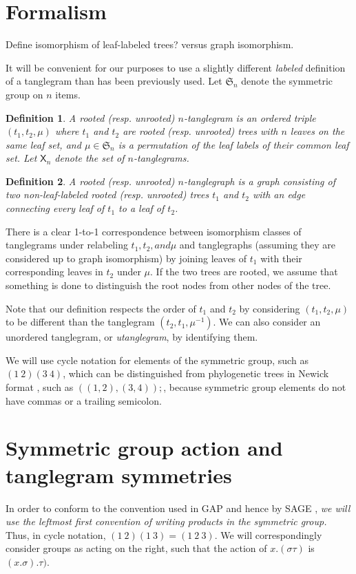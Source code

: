 \documentclass{amsart}
\newtheorem{definition}{Definition}
\newcommand{\fS}{\mathfrak S}
\newcommand{\pairing}{\mu}
\newcommand{\tangle}{\mathsf{X}}
\begin{document}
\section{Formalism}
Define isomorphism of leaf-labeled trees?
versus graph isomorphism.

It will be convenient for our purposes to use a slightly different \emph{labeled} definition of a tanglegram than has been previously used.
Let $\fS_n$ denote the symmetric group on $n$ items.
\begin{definition}
\label{def:tanglegram}
A rooted (resp. unrooted) $n$-\emph{tanglegram} is an ordered triple $(t_1, t_2, \pairing)$ where $t_1$ and $t_2$ are rooted (resp. unrooted) trees with $n$ leaves on the same leaf set, and $\pairing \in \fS_n$ is a permutation of the leaf labels of their common leaf set.
Let $\tangle_n$ denote the set of $n$-tanglegrams.
\end{definition}
\begin{definition}
\label{def:tanglegraph}
A rooted (resp. unrooted) $n$-\emph{tanglegraph} is a graph consisting of two non-leaf-labeled rooted (resp. unrooted) trees $t_1$ and $t_2$ with an edge connecting every leaf of $t_1$ to a leaf of $t_2$.
\end{definition}
There is a clear 1-to-1 correspondence between isomorphism classes of tanglegrams under relabeling $t_1, t_2, and \pairing$ and tanglegraphs (assuming they are considered up to graph isomorphism) by joining leaves of $t_1$ with their corresponding leaves in $t_2$ under $\pairing$.
If the two trees are rooted, we assume that something is done to distinguish the root nodes from other nodes of the tree.

Note that our definition respects the order of $t_1$ and $t_2$ by considering $(t_1, t_2, \pairing)$ to be different than the tanglegram $(t_2, t_1, \pairing^{-1})$.
We can also consider an unordered tanglegram, or \emph{utanglegram}, by identifying them.

We will use cycle notation for elements of the symmetric group, such as $(1\ 2) (3\ 4)$, which can be distinguished from phylogenetic trees in Newick format \cite{wiki:newick}, such as $((1,2),(3,4));$, because symmetric group elements do not have commas or a trailing semicolon.

\section{Symmetric group action and tanglegram symmetries}
In order to conform to the convention used in GAP \cite{GAP4} and hence by SAGE \cite{SteinJoyner2005}, \emph{we will use the leftmost first convention of writing products in the symmetric group.}
Thus, in cycle notation, $(1\ 2) (1\ 3) = (1\ 2\ 3)$.
We will correspondingly consider groups as acting on the right, such that the action of $x.(\sigma \tau)$ is $(x.\sigma) . \tau)$.
\end{document}
